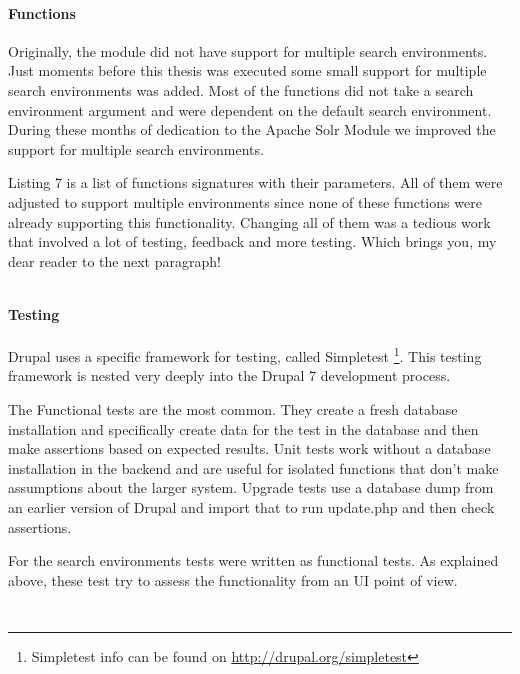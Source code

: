 \paragraph{Functions}
Originally, the module did not have support for multiple search environments. Just moments before this thesis was executed some small support for multiple search environments was added. Most of the functions did not take a search environment argument and were dependent on the default search environment. During these months of dedication to the Apache Solr Module we improved the support for multiple search environments. 

Listing 7 is a list of functions signatures with their parameters. All of them were adjusted to support multiple environments since none of these functions were already supporting this functionality. Changing all of them was a tedious work that involved a lot of testing, feedback and more testing. Which brings you, my dear reader to the next paragraph!
\inputminted[fontsize=\scriptsize,linenos]{php}{./code_examples/functions_environments.php}

\paragraph{Testing}
Drupal uses a specific framework for testing, called Simpletest \footnote{Simpletest info can be found on \url{http://drupal.org/simpletest}}. This testing framework is nested very deeply into the Drupal 7 development process. 

The Functional tests are the most common. They create a fresh database installation and specifically create data for the test in the database and then make assertions based on expected results. Unit tests work without a database installation in the backend and are useful for isolated functions that don't make assumptions about the larger system. Upgrade tests use a database dump from an earlier version of Drupal and import that to run update.php and then check assertions.

For the search environments tests were written as functional tests. As explained above, these test try to assess the functionality from an UI point of view.
\inputminted[fontsize=\scriptsize,linenos]{php}{./code_examples/testEditSearchEnvironment.php}

\inputminted[fontsize=\scriptsize,linenos]{php}{./code_examples/test_signature_search_environments.php}


